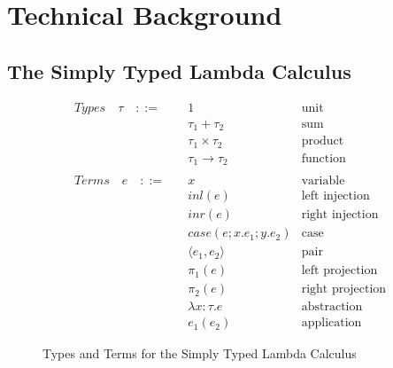 \chapter{Technical Background}
\label{chap:technical}

\section{The Simply Typed Lambda Calculus}

\begin{figure}[h]
    \begin{align*}
        Types \quad \tau \quad ::= \quad & 1 &\text{unit} \\
        & \tau_1 + \tau_2 &\text{sum} \\
        & \tau_1 \times \tau_2 &\text{product} \\
        & \tau_1 \rightarrow \tau_2 &\text{function} \\
        \\
        Terms \quad e \quad ::= \quad & x &\text{variable} \\
        & inl(e) &\text{left injection} \\
        & inr(e) &\text{right injection} \\
        & case(e;x.e_1;y.e_2) &\text{case} \\
        & \langle e_1, e_2 \rangle &\text{pair} \\
        & \pi_1 (e) &\text{left projection} \\
        & \pi_2 (e) &\text{right projection} \\
        & \lambda x: \tau. e &\text{abstraction} \\
        & e_1 (e_2) &\text{application}
    \end{align*}
    \caption{Types and Terms for the Simply Typed Lambda Calculus}
    \label{fig: tt stlc}
\end{figure}

